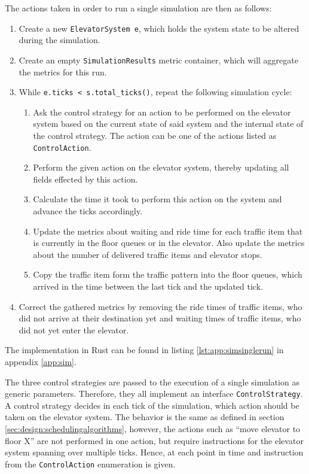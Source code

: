 The actions taken in order to run a single simulation are then as follows:
\begin{enumerate}
    \item Create a new \texttt{ElevatorSystem e}, which holds the system state to be altered during the simulation.
    \item Create an empty \texttt{SimulationResults} metric container, which will aggregate the metrics for this run.
    \item While \texttt{e.ticks < s.total\_ticks()}, repeat the following simulation cycle:
    \begin{enumerate}
        \item Ask the control strategy for an action to be performed on the elevator system based on the current state of said system and the internal state of the control strategy.
        The action can be one of the actions listed as \texttt{ControlAction}.
        \item Perform the given action on the elevator system, thereby updating all fields effected by this action.
        \item Calculate the time it took to perform this action on the system and advance the ticks accordingly.
        \item Update the  metrics about waiting and ride time for each traffic item that is currently in the floor queues or in the elevator. Also update the metrics about the number of delivered traffic items and elevator stops.
        \item Copy the traffic item form the traffic pattern into the floor queues, which arrived in the time between the last tick and the updated tick.
    \end{enumerate}
    \item Correct the gathered metrics by removing the ride times of traffic items, who did not arrive at their destination yet and waiting times of traffic items, who did not yet enter the elevator.
\end{enumerate}
The implementation in Rust can be found in listing \ref{lst:app:simsinglerun} in appendix \ref{app:sim}.

The three control strategies are passed to the execution of a single simulation as generic parameters.
Therefore, they all implement an interface \texttt{ControlStrategy}.
A control strategy decides in each tick of the simulation, which action should be taken on the elevator system.
The behavior is the same as defined in section \ref{sec:design:schedulingalgorithms}, however, the actions such as \enquote{move elevator to floor X} are not performed in one action, but require instructions for the elevator system spanning over multiple ticks.
Hence, at each point in time and instruction from the \texttt{ControlAction} enumeration is given.

